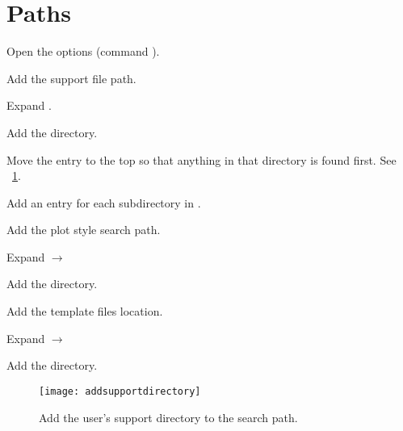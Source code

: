 \section{Paths}
\begin{numberedlist}
    \item Open the options (command ).
    \item Add the support file path.
    \begin{numberedlist}
    	\item Expand .
    	\item Add the \supportdir{} directory.
    	\item Move the entry to the top so that anything in that directory is found first.  See \figurename~\ref{fig:addsupportdirectory}.
    	\item Add an entry for each subdirectory in \blocksdir{}.
    \end{numberedlist}
    \item Add the plot style search path.
    \begin{numberedlist}
    	\item Expand $\rightarrow$
    	\item Add the \plotstyledir{} directory.
    \end{numberedlist}
    \item Add the template files location.
    \begin{numberedlist}
    	\item Expand $\rightarrow$
    	\item Add the \templatedir{} directory.
    \end{numberedlist}
\end{numberedlist}

\begin{figure}
	\centering
	\texttt{[image: addsupportdirectory]}
	\caption{Add the user's support directory to the search path.}
	\label{fig:addsupportdirectory}
\end{figure}


